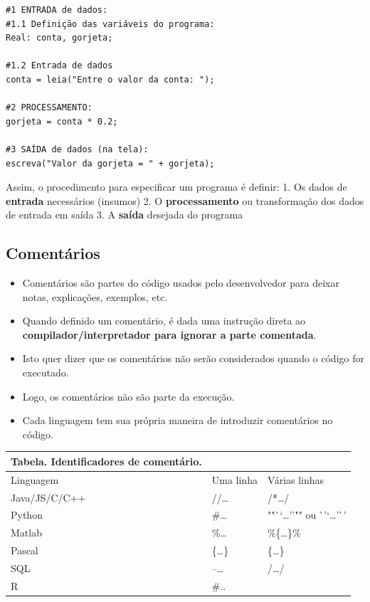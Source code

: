 \documentclass[12pt,a4paper]{article}
\providecommand{\tightlist}{%
      \setlength{\itemsep}{0pt}\setlength{\parskip}{0pt}}
\begin{document}
    \begin{verbatim}
#1 ENTRADA de dados:
#1.1 Definição das variáveis do programa:
Real: conta, gorjeta;

#1.2 Entrada de dados
conta = leia("Entre o valor da conta: ");

#2 PROCESSAMENTO:
gorjeta = conta * 0.2;

#3 SAÍDA de dados (na tela):
escreva("Valor da gorjeta = " + gorjeta);
\end{verbatim}

    Assim, o procedimento para especificar um programa é definir: 1. Os
dados de \textbf{entrada} necessários (insumos) 2. O
\textbf{processamento} ou transformação dos dados de entrada em saída 3.
A \textbf{saída} desejada do programa

    \hypertarget{comentuxe1rios}{%
\subsection{Comentários}\label{comentuxe1rios}}

    \begin{itemize}
\tightlist
\item
  Comentários são partes do código usados pelo desenvolvedor para deixar
  notas, explicações, exemplos, etc.
\item
  Quando definido um comentário, é dada uma instrução direta ao
  \textbf{compilador/interpretador para ignorar a parte comentada}.
\item
  Isto quer dizer que os comentários não serão considerados quando o
  código for executado.
\item
  Logo, os comentários não são parte da execução.
\item
  Cada linguagem tem sua própria maneira de introduzir comentários no
  código.
\end{itemize}

    \begin{longtable}[]{@{}lll@{}}
\toprule
Tabela. Identificadores de comentário. & &\tabularnewline
\midrule
\endhead
Linguagem & Uma linha & Várias linhas\tabularnewline
Java/JS/C/C++ & //\ldots{} & /*\ldots*/\tabularnewline
Python & \#\ldots{} & ""``\ldots{}''"" ou
'\,'`\ldots{}''\,'\tabularnewline
Matlab & \%\ldots{} & \%\{\ldots\}\%\tabularnewline
Pascal & \{\ldots\} & \{\emph{\ldots{}}\}\tabularnewline
SQL & --\ldots{} & /\emph{\ldots{}}/\tabularnewline
R & \#.. &\tabularnewline
\bottomrule
\end{longtable}
\end{document}
